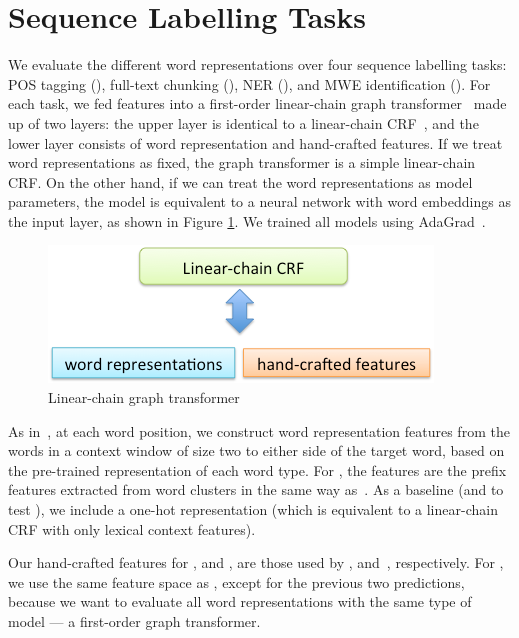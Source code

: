 \section{Sequence Labelling Tasks}
\label{sec:SeqTagging}

We evaluate the different word representations over four sequence
labelling tasks: POS tagging (\pos), full-text chunking (\chunking),
NER (\ner), and MWE identification (\mwe). For
each task, we fed features into a first-order linear-chain graph
transformer~\cite{collobert2011natural} made up of two layers: the upper
layer is identical to a linear-chain CRF~\cite{lafferty2001conditional},
and the lower layer consists of word representation and hand-crafted
features. If we treat word representations as fixed, the graph
transformer is a simple linear-chain CRF. On the other hand, if we can
treat the word representations as model parameters, the model is
equivalent to a neural network with word embeddings as the input
layer, as shown in Figure \ref{fig:graph_transformer}. We trained all models using AdaGrad~\cite{duchi2011adaptive}.


\begin{figure}[t]
   \centering
      \includegraphics[scale = 0.3]{graph_transformer.png}
   \caption{Linear-chain graph transformer}
   \label{fig:graph_transformer}
\end{figure}


As in~, at each word position, we construct word
representation features from the words in a context window of size two
to either side of the target word, based on the pre-trained
representation of each word type.  For \brown, the features are the
prefix features extracted from word clusters in the same way
as~. As a baseline (and to test \RQ[1]), we include a one-hot
representation (which is equivalent to a linear-chain CRF with only
lexical context features).

Our hand-crafted features for \pos, \chunking and \mwe, are those used
by , 
and~, respectively. For \ner, we use the same feature
space as , except for the previous two
predictions, because we want to evaluate all word representations with
the same type of model --- a first-order graph transformer.


